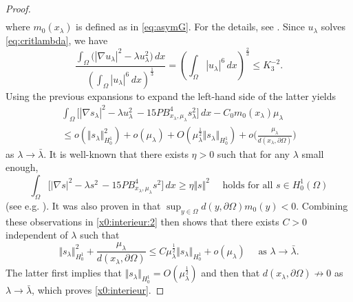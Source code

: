 \documentclass[10pt]{amsart}
\numberwithin{equation}{section}
\newcommand{\Om}{\Omega}
\theoremstyle{plain}
\theoremstyle{remark}
\begin{document}
\begin{proof}
$$\begin{aligned}
\end{aligned} $$ 
where $m_0(x_\lambda)$ is defined as in \eqref{eq:asymG}. For the details, see \cite[Proposition 4.1]{FrankKonigKovarik3autre}. Since $u_\lambda$ solves \eqref{eq:critlambda}, we have
$$ \frac{\int_{\Om} \big( |\nabla u_\lambda|^2 - \lambda u_\lambda^2\big) \, dx}{\left( \int_{\Om} |u_\lambda|^{6}\, dx\right)^{\frac13}} = \left( \int_{\Om} |u_\lambda|^{6}\, dx\right)^{\frac23} \le K_3^{-2}.$$
Using the previous expansions to expand the left-hand side of the latter yields 
\begin{equation} \label{x0:interieur:2}
 \begin{aligned} 
 \int_{\Om} \Big[ |\nabla s_\lambda|^2 - \lambda u_\lambda^2 \,  - 15 PB_{x_\lambda, \mu_\lambda}^4 s_\lambda^2\Big] \, dx - C_0 m_0(x_\lambda) \mu_\lambda  \\
 \le o(\Vert s_\lambda \Vert_{H^1_0}^2 ) +  o(\mu_\lambda) + O (\mu_\lambda^{\frac12} \Vert s_\lambda \Vert_{H^1_0}) + o \Big( \frac{\mu_\lambda}{d(x_\lambda, \partial \Om)} \Big)
  \end{aligned}
\end{equation} 
as $\lambda \to \bar{\lambda}$. It is well-known that there exists $\eta >0$ such that for any $\lambda$ small enough,
$$  \int_{\Om} \Big[ |\nabla s|^2 - \lambda s^2 \,  - 15 PB_{x_\lambda, \mu_\lambda}^4 s^2\Big] \, dx \ge \eta \Vert s \Vert^2 \quad \text{ holds for all } s \in H^1_0(\Om) $$
(see e.g.  \cite[Equation (D.1)]{Rey}). It was also proven in \cite[Equation (2.8)]{Rey} that $\sup_{y \in \Om} d(y, \partial \Om) m_0(y)  <0$. Combining these observations in \eqref{x0:interieur:2} then shows that there exists $C>0$ independent of $\lambda$ such that 
$$ \Vert s_\lambda \Vert_{H^1_0}^2 + \frac{\mu_\lambda}{d(x_\lambda, \partial \Om)} \le C \mu_\lambda^{\frac12} \Vert s_\lambda \Vert_{H^1_0} + o(\mu_\lambda) \quad \text{ as } \lambda \to \bar{\lambda}.$$
The latter first implies that $\Vert s_\lambda \Vert_{H^1_0} = O(\mu_\lambda^{\frac12})$ and then that $d(x_\lambda, \partial \Om) \not \to 0$ as $\lambda \to \bar{\lambda}$, which proves \eqref{x0:interieur}.

\medskip


\end{proof}
\end{document}
